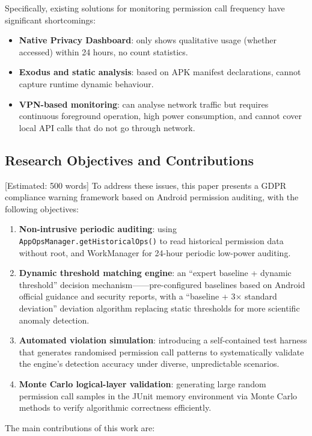 Specifically, existing solutions for monitoring permission call frequency have significant shortcomings:

\begin{itemize}
\item \textbf{Native Privacy Dashboard}: only shows qualitative usage (whether accessed) within 24 hours, no count statistics.
\item \textbf{Exodus and static analysis}: based on APK manifest declarations, cannot capture runtime dynamic behaviour.
\item \textbf{VPN-based monitoring}: can analyse network traffic but requires continuous foreground operation, high power consumption, and cannot cover local API calls that do not go through network.
\end{itemize}

\subsection{Research Objectives and Contributions} [Estimated: 500 words]
To address these issues, this paper presents a GDPR compliance warning framework based on Android permission auditing, with the following objectives:

\begin{enumerate}
\item \textbf{Non-intrusive periodic auditing}: using \texttt{AppOpsManager.getHistoricalOps()} to read historical permission data without root, and WorkManager for 24-hour periodic low-power auditing.
\item \textbf{Dynamic threshold matching engine}: an ``expert baseline + dynamic threshold'' decision mechanism——pre-configured baselines based on Android official guidance and security reports, with a ``baseline + 3× standard deviation'' deviation algorithm replacing static thresholds for more scientific anomaly detection.
\item \textbf{Automated violation simulation}: introducing a self-contained test harness that generates randomised permission call patterns to systematically validate the engine's detection accuracy under diverse, unpredictable scenarios.
\item \textbf{Monte Carlo logical-layer validation}: generating large random permission call samples in the JUnit memory environment via Monte Carlo methods to verify algorithmic correctness efficiently.
\end{enumerate}

The main contributions of this work are:

